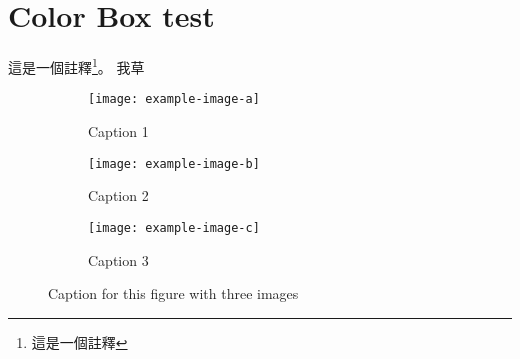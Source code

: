 \documentclass[12pt]{article}
\begin{document}
\section{Color Box test}
\thm{}{}
這是一個註釋\footnote{這是一個註釋}。
我草

\begin{figure}[H]
	\centering
	\begin{subfigure}{0.3\textwidth}
		\centering
		\texttt{[image: example-image-a]}
		\caption{Caption 1}
		\label{fig:sub1}
	\end{subfigure}
	\begin{subfigure}{0.3\textwidth}
		\centering
		\texttt{[image: example-image-b]}
		\caption{Caption 2}
		\label{fig:sub2}
	\end{subfigure}
	\begin{subfigure}{0.3\textwidth}
		\centering
		\texttt{[image: example-image-c]}
		\caption{Caption 3}
		\label{fig:sub3}
	\end{subfigure}
	\caption{Caption for this figure with three images}
	\label{fig:image3}
\end{figure}


\nocite{*}


\end{document}
